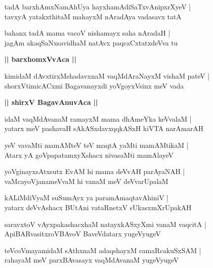 \documentclass[twoside,12pt,openright]{book}
\newcounter{shloka}[chapter]
\def\uvaca#1{\centerline{{\large\textbf{#1}}}}
\begin{document}
\begin{shloka}%
tadA barxhAmxNamAhUya hayxhamAdiSaTxvAnipxrXyeV |\\
tavxyA yatakxthitaM mahayxM nAradAya vadasavx tatA 
\end{shloka}

\begin{shloka}%
bahanx tadA mama vacoV nishamayx saha nAradaH |\\
jagAm akaqSaNxsavidhaM natAvx paqcaCxtatxdeVva tu
\end{shloka}

\uvaca{|| barxhomxVvAca ||}

\begin{shloka}%
kimidaM dAvxtirxMshadavxnaM vaqMdAraNayxM vishaM pateV |\\
shorxVtimicACxmi Bagavanayxdi yoVgoyxVsinx meV vada
\end{shloka}

\uvaca{|| shirxV BagavAnuvAca ||}

\begin{shloka}%
idaM vaqMdAvanaM ramayxM mama dhAmeYka keVvalaM |\\
yatarx meV pashavaH sAkASxdavxqqkASxH kiVTA narAmarAH 
\end{shloka}

\begin{shloka}%
yeV vavaMti mamAMteV teV maqtA yaMti mamAMtikaM |\\
Atarx yA goVpapatamxyXshacx nivasaMti mamAlayeV 
\end{shloka}

\begin{shloka}%
yoVginayxsAtxsutx EvAM hi mama deVvAH parAyaNAH |\\
vaMcayoVjanameVvaM hi vanaM meV deVvarUpalaM  
\end{shloka}

\begin{shloka}%
kALiMdiVyaM suSumAyx ya paramAmaqtavAhiniV |\\
yatarx deVvAshacx BUtAni vataRnetxV sUkasxmXrUpakAH 
\end{shloka}

\begin{shloka}%
saravxtoV vAyxpakashacxhaM natayxkASxyXmi vanaM vaqcitA |\\
ApiBARvasitxroVBAvoV BaveVdatarx yugeVyugeV 
\end{shloka}

\begin{shloka}%
teVcoVmayamidaM sAthxnaM adaqshayxM camaRcakuSxSAM |\\
rahayaM meV parxBAvasayx vaqMdAvanaM yugeVyugeV
\end{shloka}
\end{document}
